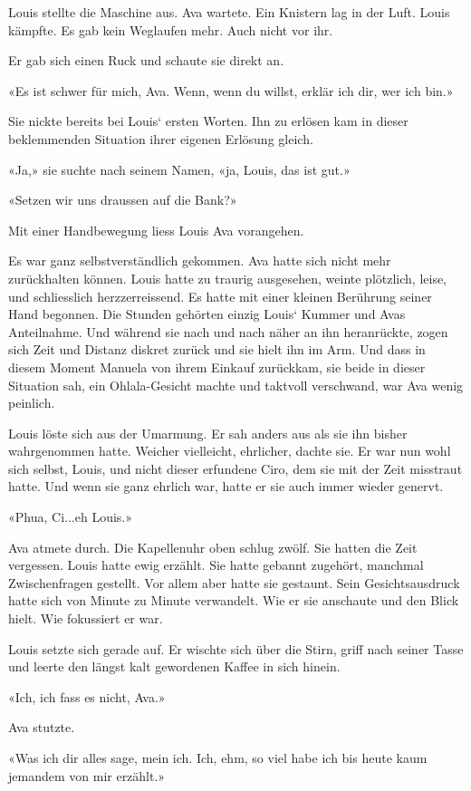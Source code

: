 Louis stellte die Maschine aus. Ava wartete. Ein Knistern lag in der
Luft. Louis kämpfte. Es gab kein Weglaufen mehr. Auch nicht vor ihr.

Er gab sich einen Ruck und schaute sie direkt an.

«Es ist schwer für mich, Ava. Wenn, wenn du willst, erklär ich dir, wer
ich bin.»

Sie nickte bereits bei Louis` ersten Worten. Ihn zu erlösen kam in
dieser beklemmenden Situation ihrer eigenen Erlösung gleich.

«Ja,» sie suchte nach seinem Namen, «ja, Louis, das ist gut.»

«Setzen wir uns draussen auf die Bank?»

Mit einer Handbewegung liess Louis Ava vorangehen.

Es war ganz selbstverständlich gekommen. Ava hatte sich nicht mehr
zurückhalten können. Louis hatte zu traurig ausgesehen, weinte
plötzlich, leise, und schliesslich herzzerreissend. Es hatte mit einer
kleinen Berührung seiner Hand begonnen. Die Stunden gehörten einzig
Louis` Kummer und Avas Anteilnahme. Und während sie nach und nach näher
an ihn heranrückte, zogen sich Zeit und Distanz diskret zurück und sie
hielt ihn im Arm. Und dass in diesem Moment Manuela von ihrem Einkauf
zurückkam, sie beide in dieser Situation sah, ein Ohlala-Gesicht machte
und taktvoll verschwand, war Ava wenig peinlich.

Louis löste sich aus der Umarmung. Er sah anders aus als sie ihn bisher
wahrgenommen hatte. Weicher vielleicht, ehrlicher, dachte sie. Er war
nun wohl sich selbst, Louis, und nicht dieser erfundene Ciro, dem sie
mit der Zeit misstraut hatte. Und wenn sie ganz ehrlich war, hatte er
sie auch immer wieder genervt.

«Phua, Ci...eh Louis.»

Ava atmete durch. Die Kapellenuhr oben schlug zwölf. Sie hatten die Zeit
vergessen. Louis hatte ewig erzählt. Sie hatte gebannt zugehört,
manchmal Zwischenfragen gestellt. Vor allem aber hatte sie gestaunt.
Sein Gesichtsausdruck hatte sich von Minute zu Minute verwandelt. Wie er
sie anschaute und den Blick hielt. Wie fokussiert er war.

Louis setzte sich gerade auf. Er wischte sich über die Stirn, griff nach
seiner Tasse und leerte den längst kalt gewordenen Kaffee in sich
hinein.

«Ich, ich fass es nicht, Ava.»

Ava stutzte.

«Was ich dir alles sage, mein ich. Ich, ehm, so viel habe ich bis heute
kaum jemandem von mir erzählt.»

